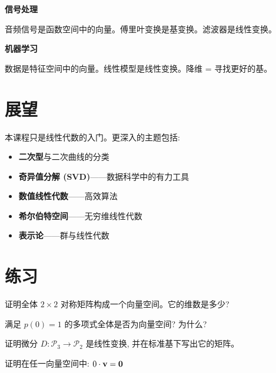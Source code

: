\begin{practical}
\textbf{信号处理}

音频信号是函数空间中的向量。傅里叶变换是基变换。滤波器是线性变换。
\end{practical}

\begin{practical}
\textbf{机器学习}

数据是特征空间中的向量。线性模型是线性变换。降维 = 寻找更好的基。
\end{practical}

\section{展望}

\begin{remark}
本课程只是线性代数的入门。更深入的主题包括:
\begin{itemize}
    \item \textbf{二次型}与二次曲线的分类
    \item \textbf{奇异值分解 (SVD)}——数据科学中的有力工具
    \item \textbf{数值线性代数}——高效算法
    \item \textbf{希尔伯特空间}——无穷维线性代数
    \item \textbf{表示论}——群与线性代数
\end{itemize}
\end{remark}

\section{练习}

\begin{exercise}
证明全体 $2 \times 2$ 对称矩阵构成一个向量空间。它的维数是多少?
\end{exercise}

\begin{exercise}
满足 $p(0) = 1$ 的多项式全体是否为向量空间? 为什么?
\end{exercise}

\begin{exercise}
证明微分 $D: \mathcal{P}_3 \to \mathcal{P}_2$ 是线性变换, 并在标准基下写出它的矩阵。
\end{exercise}

\begin{exercise}
证明在任一向量空间中: $0 \cdot \mathbf{v} = \mathbf{0}$
\end{exercise}

